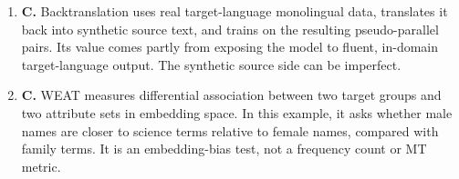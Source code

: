 \documentclass[11pt,a4paper]{article}
\begin{document}
\begin{enumerate}[leftmargin=*]
\begin{enumerate}
\item \textbf{C.} Backtranslation uses real target-language monolingual data, translates it back into synthetic source text, and trains on the resulting pseudo-parallel pairs. Its value comes partly from exposing the model to fluent, in-domain target-language output. The synthetic source side can be imperfect.
\item \textbf{C.} WEAT measures differential association between two target groups and two attribute sets in embedding space. In this example, it asks whether male names are closer to science terms relative to female names, compared with family terms. It is an embedding-bias test, not a frequency count or MT metric.
\end{enumerate}
\end{enumerate}
\end{document}
